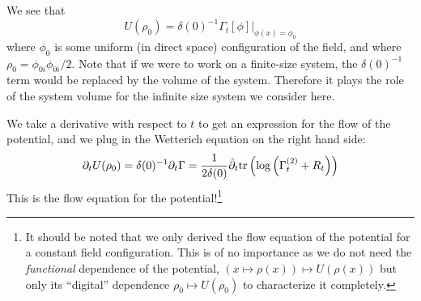 We see that 
\begin{equation}
U(\rho_0) = \delta(0)^{-1} \Gamma_t[ \phi] |_{\phi(x) = \phi_0}
\end{equation}
where $\phi_0$ is some uniform (in direct space) configuration of the field, and where $\rho_0 = \phi_{0i} \phi_{0i}/2$. Note that if we were to work on a finite-size system, the $\delta(0)^{-1}$ term would be replaced by the volume of the system. Therefore it plays the role of the system volume for the infinite size system we consider here.

We take a derivative with respect to $t$ to get an expression for the flow of the potential, and we plug in the Wetterich equation on the right hand side:
\begin{equation}
 \partial_t U(\rho_0) = \delta(0)^{-1} \partial_t \Gamma = \frac{1}{2 \delta(0)} \hat \partial_t  \text{tr}\left(\log\left( \Gamma_t^{(2)} + R_t  \right)\right) 
\end{equation}
This is the flow equation for the potential!\footnote{It should be noted that we only derived the flow equation of the potential for a constant field configuration. This is of no importance as we do not need the \textit{functional} dependence of the potential, $(x \mapsto \rho(x)) \mapsto U(\rho(x))$ but only its ``digital'' dependence $\rho_0 \mapsto U(\rho_0)$ to characterize it completely.}

